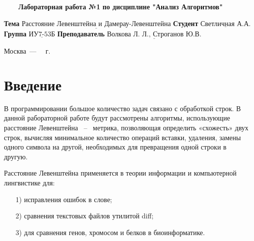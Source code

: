 \documentclass[a4paper,14pt, unknownkeysallowed]{extreport}
\begin{document}
\begin{titlepage}
	
	\begin{center}
		\noindent\begin{minipage}{1.3\textwidth}\centering
		\Large\textbf{   ~~~ Лабораторная работа №1}\newline
		\textbf{по дисциплине "Анализ Алгоритмов"}\newline\newline\newline
		\end{minipage}
	\end{center}
	
	\noindent\textbf{Тема} 			$\underline{\text{Расстояние Левенштейна и Дамерау-Левенштейна}}$\newline\newline
	\noindent\textbf{Студент} 		$\underline{\text{Светличная А.А.}}$\newline\newline
	\noindent\textbf{Группа} 		$\underline{\text{ИУ7-53Б}}$\newline\newline
	\noindent\textbf{Преподаватель} $\underline{\text{Волкова Л. Л., Строганов Ю.В.}}$\newline
	
	\begin{center}
		\vfill
		Москва~---~\the\year
		~г.
	\end{center}
	\restoregeometry
\end{titlepage}
	
	\setcounter{page}{2}
	\tableofcontents
	
	\newpage
	\chapter*{Введение}
	
	
В программировании большое количество задач связано с обработкой строк. 
В данной рабораторной работе будут рассмотрены алгоритмы, использующие расстояние Левенштейна ~--~ метрика, позволяющая определить «схожесть» двух строк, вычисляя минимальное количество операций вставки, удаления, замены одного символа на другой, необходимых для превращения одной строки в другую.

Расстояние Левенштейна применяется в теории информации и компьютерной лингвистике для:

\begin{itemize}
	\item[1)] исправления ошибок в слове;
	\item[2)] сравнения текстовых файлов утилитой diff;
	\item[3)] для сравнения генов, хромосом и белков в биоинформатике.
\end{itemize}
\end{document}
